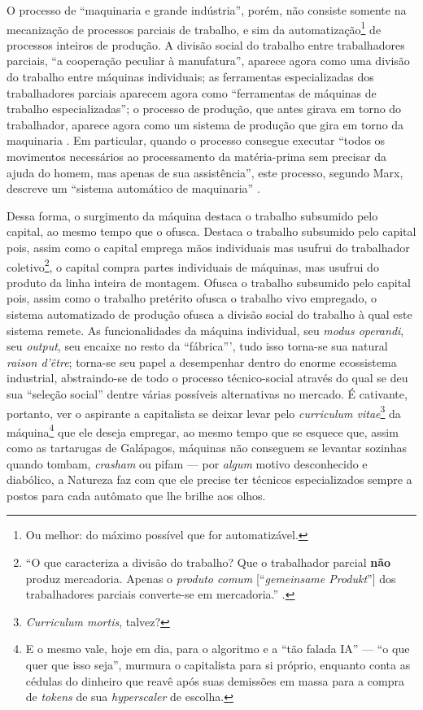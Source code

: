 \documentclass[12pt]{article}
\numberwithin{equation}{section}
\theoremstyle{plain}
\theoremstyle{definition}
\theoremstyle{remark}
\begin{document}
O processo de ``maquinaria e grande indústria'', porém, não consiste somente na mecanização de processos parciais de trabalho, e sim da automatização\footnote{Ou melhor: do máximo possível que for automatizável.} de processos inteiros de produção. A divisão social do trabalho entre trabalhadores parciais, ``a cooperação peculiar à manufatura'', aparece agora como uma divisão do trabalho entre máquinas individuais; as ferramentas especializadas dos trabalhadores parciais aparecem agora como ``ferramentas de máquinas de trabalho especializadas''; o processo de produção, que antes girava em torno do trabalhador, aparece agora como um sistema de produção que gira em torno da maquinaria \parencite[, p. 453]{Marx2017}. Em particular, quando o processo consegue executar ``todos os movimentos necessários ao processamento da matéria-prima sem precisar da ajuda do homem, mas apenas de sua assistência'', este processo, segundo Marx, descreve um ``sistema automático de maquinaria'' \parencite[, p. 455]{Marx2017}.

Dessa forma, o surgimento da máquina destaca o trabalho subsumido pelo capital, ao mesmo tempo que o ofusca. Destaca o trabalho subsumido pelo capital pois, assim como o capital emprega mãos individuais mas usufrui do trabalhador coletivo\footnote{``O que caracteriza a divisão do trabalho? Que o trabalhador parcial \textbf{não} produz mercadoria. Apenas o \textit{produto comum} {[}``\textit{gemeinsame Produkt}''{]} dos trabalhadores parciais converte-se em mercadoria.'' \parencite[, p. 429, grifo e adendo meus]{Marx2017}.}, o capital compra partes individuais de máquinas, mas usufrui do produto da linha inteira de montagem. Ofusca o trabalho subsumido pelo capital pois, assim como o trabalho pretérito ofusca o trabalho vivo empregado, o sistema automatizado de produção ofusca a divisão social do trabalho à qual este sistema remete. As funcionalidades da máquina individual, seu \textit{modus operandi}, seu \textit{output}, seu encaixe no resto da ``fábrica''', tudo isso torna-se sua natural \textit{raison d'être}; torna-se seu papel a desempenhar dentro do enorme ecossistema industrial, abstraindo-se de todo o processo técnico-social através do qual se deu sua ``seleção social'' dentre várias possíveis alternativas no mercado. É cativante, portanto, ver o aspirante a capitalista se deixar levar pelo \textit{curriculum vitae}\footnote{\textit{Curriculum mortis}, talvez?} da máquina\footnote{E o mesmo vale, hoje em dia, para o algoritmo e a ``tão falada IA'' --- ``o que quer que isso seja'', murmura o capitalista para si próprio, enquanto conta as cédulas do dinheiro que reavê após suas demissões em massa para a compra de \textit{tokens} de sua \textit{hyperscaler} de escolha.} que ele deseja empregar, ao mesmo tempo que se esquece que, assim como as tartarugas de Galápagos, máquinas não conseguem se levantar sozinhas quando tombam, \textit{crasham} ou pifam --- por \textit{algum} motivo desconhecido e diabólico, a Natureza faz com que ele precise ter técnicos especializados sempre a postos para cada autômato que lhe brilhe aos olhos.
\end{document}

